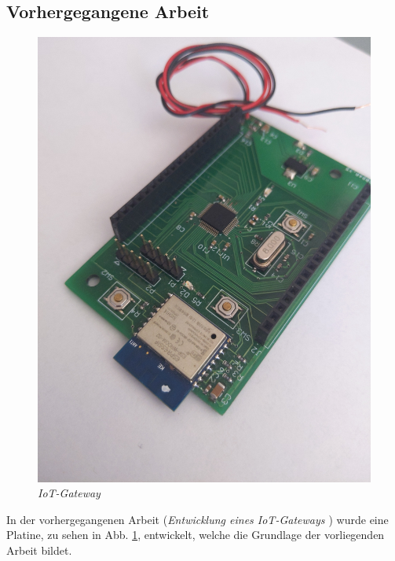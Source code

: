 \subsection{Vorhergegangene Arbeit}



\begin{figure}
     \vspace{-\baselineskip}
         \centering
         \includegraphics[scale=0.05]{Pictures/assembled.jpg}
         \caption{\textit{IoT-Gateway \citep{IoTGateway}}}
         \label{img:IoT-Gateway}
 \end{figure}

In der vorhergegangenen Arbeit (\textit{Entwicklung eines IoT-Gateways \citep{IoTGateway}}) wurde eine Platine, zu sehen in Abb. \ref{img:IoT-Gateway}, 
entwickelt, welche die Grundlage der vorliegenden Arbeit bildet. 

